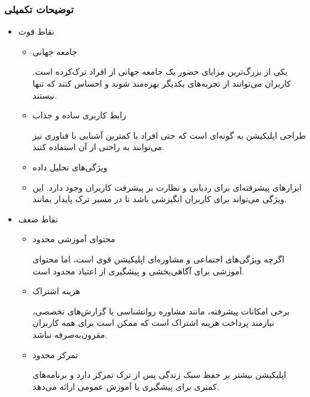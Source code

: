 \documentclass[dvipsnames, svgnames, x11names, 11pt]{article}
\begin{document}
\subsubsection{توضیحات تکمیلی}
\begin{itemize}
\item
نقاط قوت

\begin{itemize}
\item 
جامعه جهانی

یکی از بزرگ‌ترین مزایای  حضور یک جامعه جهانی از افراد ترک‌کرده است. کاربران می‌توانند از تجربه‌های یکدیگر بهره‌مند شوند و احساس کنند که تنها نیستند.

\item 
رابط کاربری ساده و جذاب

طراحی اپلیکیشن به گونه‌ای است که حتی افراد با کمترین آشنایی با فناوری نیز می‌توانند به راحتی از آن استفاده کنند.

\item 
ویژگی‌های تحلیل داده
\item 
ابزارهای پیشرفته‌ای برای ردیابی و نظارت بر پیشرفت کاربران وجود دارد. این ویژگی می‌تواند برای کاربران انگیزشی باشد تا در مسیر ترک پایدار بمانند.
\end{itemize}

\item
نقاط ضعف
\begin{itemize}
\item 
محتوای آموزشی محدود

اگرچه ویژگی‌های اجتماعی و مشاوره‌ای اپلیکیشن قوی است، اما محتوای آموزشی برای آگاهی‌بخشی و پیشگیری از اعتیاد محدود است.

\item 
هزینه اشتراک

برخی امکانات پیشرفته، مانند مشاوره روانشناسی یا گزارش‌های تخصصی، نیازمند پرداخت هزینه اشتراک است که ممکن است برای همه کاربران مقرون‌به‌صرفه نباشد.

\item 
تمرکز محدود

اپلیکیشن بیشتر بر حفظ سبک زندگی پس از ترک تمرکز دارد و برنامه‌های کمتری برای پیشگیری یا آموزش عمومی ارائه می‌دهد.
\end{itemize}
\end{itemize}

\subsection{}
\end{document}
